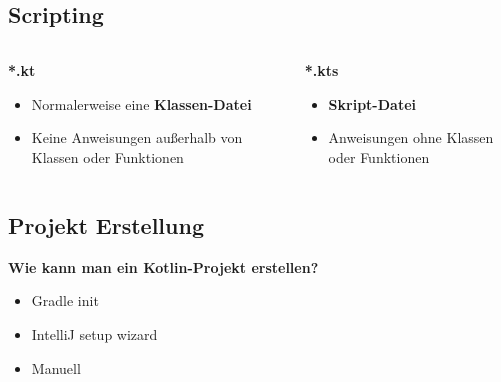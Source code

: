     \subsection{Scripting}\label{subsec:scripting}
    \begin{frame}
        \slidehead
        \begin{columns}[c]
            \begin{column}{.5\textwidth}
                \centering
                \Large
                \textbf{*.kt}
                \vspace{1em}
                \normalsize
                \begin{itemize}
                    \item Normalerweise eine \textbf{Klassen-Datei}
                    \item Keine Anweisungen außerhalb von Klassen oder Funktionen
                \end{itemize}
            \end{column}
            \begin{column}{.5\textwidth}
                \centering
                \Large
                \textbf{*.kts}
                \vspace{1em}
                \normalsize
                \begin{itemize}
                    \item \textbf{Skript-Datei}
                    \item Anweisungen ohne Klassen oder Funktionen
                \end{itemize}
            \end{column}
        \end{columns}
    \end{frame}

    \subsection{Projekt Erstellung}\label{subsec:projekt-erstellung}
    \begin{frame}
        \slidehead
        \large
        \textbf{Wie kann man ein Kotlin-Projekt erstellen?}
        \begin{itemize}[<+->]
            \item Gradle init
            \item IntelliJ setup wizard
            \item Manuell
        \end{itemize}
    \end{frame}


